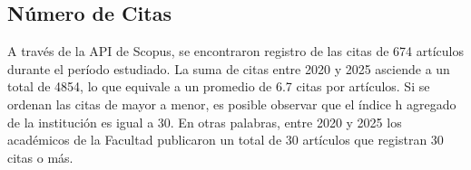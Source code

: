 \documentclass[
  a4paper,
  oneside]{scrbook}
\begin{document}
\begin{table}[H]

\caption{\label{tbl-index-carac}Publicaciones por Indexación y
características de los autores}


\end{table}%

\subsection{Número de Citas}\label{nuxfamero-de-citas}

A través de la API de Scopus, se encontraron registro de las citas de
674 artículos durante el período estudiado. La suma de citas entre 2020
y 2025 asciende a un total de 4854, lo que equivale a un promedio de 6.7
citas por artículos. Si se ordenan las citas de mayor a menor, es
posible observar que el índice h agregado de la institución es igual a
30. En otras palabras, entre 2020 y 2025 los académicos de la Facultad
publicaron un total de 30 artículos que registran 30 citas o más.
\end{document}
